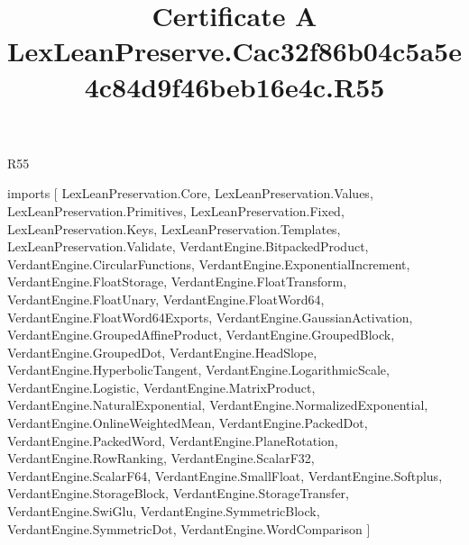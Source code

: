 \begin{lexlean}{R55}
\title{Certificate A LexLeanPreserve.Cac32f86b04c5a5e4c84d9f46beb16e4c.R55}
\begin{coremodule}
imports [
  LexLeanPreservation.Core,
  LexLeanPreservation.Values,
  LexLeanPreservation.Primitives,
  LexLeanPreservation.Fixed,
  LexLeanPreservation.Keys,
  LexLeanPreservation.Templates,
  LexLeanPreservation.Validate,
  VerdantEngine.BitpackedProduct,
  VerdantEngine.CircularFunctions,
  VerdantEngine.ExponentialIncrement,
  VerdantEngine.FloatStorage,
  VerdantEngine.FloatTransform,
  VerdantEngine.FloatUnary,
  VerdantEngine.FloatWord64,
  VerdantEngine.FloatWord64Exports,
  VerdantEngine.GaussianActivation,
  VerdantEngine.GroupedAffineProduct,
  VerdantEngine.GroupedBlock,
  VerdantEngine.GroupedDot,
  VerdantEngine.HeadSlope,
  VerdantEngine.HyperbolicTangent,
  VerdantEngine.LogarithmicScale,
  VerdantEngine.Logistic,
  VerdantEngine.MatrixProduct,
  VerdantEngine.NaturalExponential,
  VerdantEngine.NormalizedExponential,
  VerdantEngine.OnlineWeightedMean,
  VerdantEngine.PackedDot,
  VerdantEngine.PackedWord,
  VerdantEngine.PlaneRotation,
  VerdantEngine.RowRanking,
  VerdantEngine.ScalarF32,
  VerdantEngine.ScalarF64,
  VerdantEngine.SmallFloat,
  VerdantEngine.Softplus,
  VerdantEngine.StorageBlock,
  VerdantEngine.StorageTransfer,
  VerdantEngine.SwiGlu,
  VerdantEngine.SymmetricBlock,
  VerdantEngine.SymmetricDot,
  VerdantEngine.WordComparison
]


\end{coremodule}
\end{lexlean}
